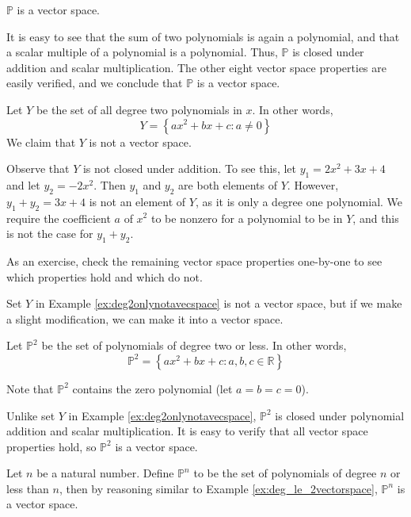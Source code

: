 \documentclass{ximera}
\begin{document}
\begin{example}\label{ex:pisavectorspace}
$\mathbb{P}$ is a vector space.  
\begin{explanation}It is easy to see that the sum of two polynomials is again a polynomial, and that a scalar multiple of a polynomial is a polynomial.  Thus, $\mathbb{P}$ is closed under addition and scalar multiplication.  The other eight vector space properties are easily verified, and we conclude that $\mathbb{P}$ is a vector space.
\end{explanation}
\end{example}
\begin{example}\label{ex:deg2onlynotavecspace}
Let $Y$ be the set of all degree two polynomials in $x$.  In other words,
$$Y=\left\{ax^2+bx+c : a \ne 0 \right\}$$
We claim that $Y$ is not a vector space.
\begin{explanation}
Observe that $Y$ is not closed under addition.  To see this, let $y_1 = 2x^2+3x+4$ and let $y_2=-2x^2$.  Then $y_1$ and $y_2$ are both elements of $Y$.  However, $y_1+y_2 = 3x+4$ is not an element of $Y$, as it is only a degree one polynomial.  We require the coefficient $a$ of $x^2$ to be nonzero for a polynomial to be in $Y$, and this is not the case for $y_1+y_2$.

As an exercise, check the remaining vector space properties one-by-one to see which properties hold and which do not.  
\end{explanation} %
\end{example}

Set $Y$ in Example \ref{ex:deg2onlynotavecspace} is not a vector space, but if we make a slight modification, we can make it into a vector space.  

\begin{example}\label{ex:deg_le_2vectorspace}
Let  $\mathbb{P}^2$ be the set of polynomials of degree two or less.  In other words,
$$\mathbb{P}^2=\left\{ax^2+bx+c : a,b,c \in \mathbb{R} \right\}$$

Note that $\mathbb{P}^2$ contains the zero polynomial (let $a=b=c=0$).  

Unlike set $Y$ in Example \ref{ex:deg2onlynotavecspace}, $\mathbb{P}^2$ is closed under polynomial addition and scalar multiplication.  It is easy to verify that all vector space properties hold, so $\mathbb{P}^2$ is a vector space.
\end{example}
\begin{example}\label{ex:pnisavectorspace}
Let $n$ be a natural number.  Define $\mathbb{P}^n$ to be the set of polynomials of degree $n$ or less than $n$, then by reasoning similar to Example \ref{ex:deg_le_2vectorspace}, $\mathbb{P}^n$ is a vector space.
\end{example}
\end{document}
